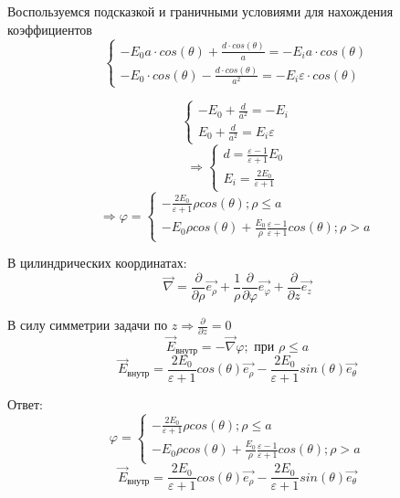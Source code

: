 \documentclass[12pt]{article}
\begin{document}
\begin{large}
\[\]
\par Воспользуемся подсказкой и граничными условиями для нахождения коэффициентов
\[
    \begin{cases}
        -E_0 a \cdot cos(\theta) + \frac{d \cdot cos(\theta)}{a} = -E_i a \cdot cos(\theta)
        \\
        -E_0 \cdot cos(\theta) - \frac{d \cdot cos(\theta)}{a^2} = -E_i \varepsilon \cdot cos(\theta)
    \end{cases}
\]
\par
\[
    \begin{cases}
        -E_0  + \frac{d}{a^2} = -E_i
        \\
        E_0 + \frac{d}{a^2} = E_i \varepsilon
    \end{cases}
\]
\[
    \Rightarrow
    \begin{cases}
        d = \frac{\varepsilon - 1}{\varepsilon + 1}E_0
        \\
        E_i = \frac{2E_0}{\varepsilon + 1}
    \end{cases}
\]
\[
    \Rightarrow  \varphi =
    \begin{cases}
        - \frac{2E_0}{\varepsilon + 1} \rho cos(\theta) ; \rho \leqslant a
        \\
        -E_0 \rho cos(\theta) + \frac{E_0}{\rho}\frac{\varepsilon - 1}{\varepsilon + 1} cos(\theta) ; \rho > a
    \end{cases}
\]
\par В цилиндрических координатах:
\[
    \overrightarrow{\nabla} = \frac{\partial}{\partial \rho} \vec{e_\rho} + \frac{1}{\rho} \frac{\partial}{\partial \varphi} \vec{e_\varphi} + \frac{\partial}{\partial z} \vec{e_z}
\]
\par В силу симметрии задачи по $z \Rightarrow \frac{\partial}{\partial z} = 0$
\[
    \overrightarrow{E}_{\text{внутр}} = - \overrightarrow{\nabla} \varphi ; \text{ при } \rho \leqslant a
\]
\[
    \overrightarrow{E}_{\text{внутр}} = \frac{2E_0}{\varepsilon + 1} cos(\theta) \vec{e_\rho} - \frac{2E_0}{\varepsilon + 1} sin(\theta) \vec{e_\theta}
\]
\par Ответ:
\[
    \varphi =
    \begin{cases}
        - \frac{2E_0}{\varepsilon + 1} \rho cos(\theta) ; \rho \leqslant a
        \\
        -E_0 \rho cos(\theta) + \frac{E_0}{\rho}\frac{\varepsilon - 1}{\varepsilon + 1} cos(\theta) ; \rho > a
    \end{cases}
\]
\[
    \overrightarrow{E}_{\text{внутр}} = \frac{2E_0}{\varepsilon + 1} cos(\theta) \vec{e_\rho} - \frac{2E_0}{\varepsilon + 1} sin(\theta) \vec{e_\theta}
\]
\end{large}
\end{document}
